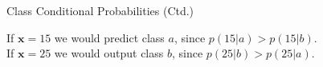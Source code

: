 \begin{frame}{Class Conditional Probabilities (Ctd.)}{}
	\vspace*{3mm}
	\begin{boxBlueNoFrame}
		If $\bm{x} = 15$ we would predict class $a$, since $p(15 \vert a) > p(15 \vert b)$. \\
		If $\bm{x} = 25$ we would output class $b$, since $p(25 \vert b) > p(25 \vert a)$.
	\end{boxBlueNoFrame}
\end{frame}


